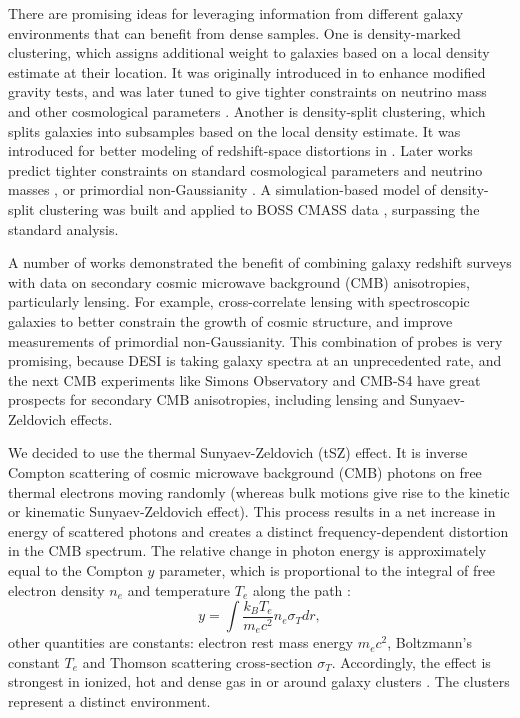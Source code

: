 There are promising ideas for leveraging information from different galaxy environments that can benefit from dense samples.
One is density-marked clustering, which assigns additional weight to galaxies based on a local density estimate at their location.
It was originally introduced in \cite{density-marked-CF-MG} to enhance modified gravity tests,
and was later tuned to give tighter constraints on neutrino mass \citep{density-marked-PS-neutrinos} and other cosmological parameters \citep{density-marked-PS-cosmoinfo,density-marked-PS-SBI}.
Another is density-split clustering, which splits galaxies into subsamples based on the local density estimate.
It was introduced for better modeling of redshift-space distortions in \cite{density-split-clustering-RSD}.
Later works predict tighter constraints on standard cosmological parameters and neutrino masses \citep{density-split-clustering-constrain-nuLCDM}, or primordial non-Gaussianity \citep{density-split-clustering-PNG}.
A simulation-based model of density-split clustering was built \citep{density-split-clustering-sim-based-model} and applied to BOSS CMASS data \citep{density-split-clustering-BOSS-CMASS}, surpassing the standard analysis.

A number of works demonstrated the benefit of combining galaxy redshift surveys with data on secondary cosmic microwave background (CMB) anisotropies, particularly lensing.
For example, \cite{ACT-lensingxDESI-LRG-structure-formation-Kim,ACT-lensingxDESI-LRG-structure-formation-Sailer} cross-correlate lensing with spectroscopic galaxies to better constrain the growth of cosmic structure, and \cite{DESI-QSOxPlanck-lensing-PNG,DESI-LRGxPlanck-lensing-PNG} improve measurements of primordial non-Gaussianity.
This combination of probes is very promising, because DESI is taking galaxy spectra at an unprecedented rate, and the next CMB experiments like Simons Observatory \citep{SO} and CMB-S4 \citep{CMBS4,CMBS4white} have great prospects for secondary CMB anisotropies, including lensing and Sunyaev-Zeldovich effects.

We decided to use the thermal Sunyaev-Zeldovich (tSZ) effect.
It is inverse Compton scattering of cosmic microwave background (CMB) photons on free thermal electrons moving randomly (whereas bulk motions give rise to the kinetic or kinematic Sunyaev-Zeldovich effect).
This process results in a net increase in energy of scattered photons and creates a distinct frequency-dependent distortion in the CMB spectrum.
The relative change in photon energy is approximately equal to the Compton $y$ parameter, which is proportional to the integral of free electron density $n_e$ and temperature $T_e$ along the path \citep[with length element $dr$;][]{Planck-SZ-map,Sunyaev-Zeldovich-1972}:
\begin{equation} \label{eq:y-parameter-0}
    y = \int \frac{k_B T_e}{m_e c^2} n_e \sigma_T dr,
\end{equation}
other quantities are constants: electron rest mass energy $m_e c^2$, Boltzmann's constant $T_e$ and Thomson scattering cross-section $\sigma_T$.
Accordingly, the effect is strongest in ionized, hot and dense gas in or around galaxy clusters \citep[as suggested by][]{Sunyaev-Zeldovich-1970,Sunyaev-Zeldovich-1980-review}.
The clusters represent a distinct environment.

